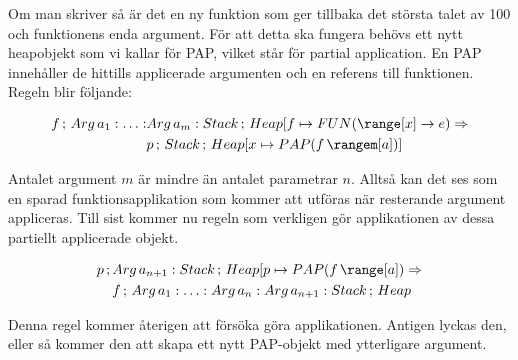 \documentclass[../Core]{subfiles}
\begin{document}
Om man skriver  så är det en ny funktion som
ger tillbaka det största talet av 100 och funktionens enda argument. För att
detta ska fungera behövs ett nytt heapobjekt som vi kallar för PAP, vilket står för partial
application. En PAP innehåller de hittills applicerade argumenten och en referens till funktionen.
Regeln blir följande:

\begin{align*}
f\,;\, Arg\, a_{1}:\ldots:&Arg\, a_{m}:Stack\,;\, Heap[f\mapsto\FUN{\range[x]}e \Rightarrow \\
 & p\,;\, Stack\,;\, Heap[x\mapsto\PAP f{\rangem[a]}]
\end{align*}


Antalet argument $m$ är mindre än antalet parametrar $n$.
Alltså kan det ses som en sparad funktionsapplikation som kommer att
utföras när resterande argument appliceras. Till sist kommer nu
regeln som verkligen gör applikationen av dessa partiellt applicerade
objekt.

\begin{align*}
p\,;\, & Arg\, a_{n+1}:Stack\,;\, Heap[p\mapsto\PAP f{\range[a]} \Rightarrow \\
 & f\,;\, Arg\, a_{1}:\ldots:Arg\, a_{n}:Arg\, a_{n+1}:Stack\,;\, Heap
\end{align*}


Denna regel kommer återigen att försöka göra applikationen. Antigen lyckas
den, eller så kommer den att skapa ett nytt PAP-objekt med ytterligare
argument.
\end{document}
